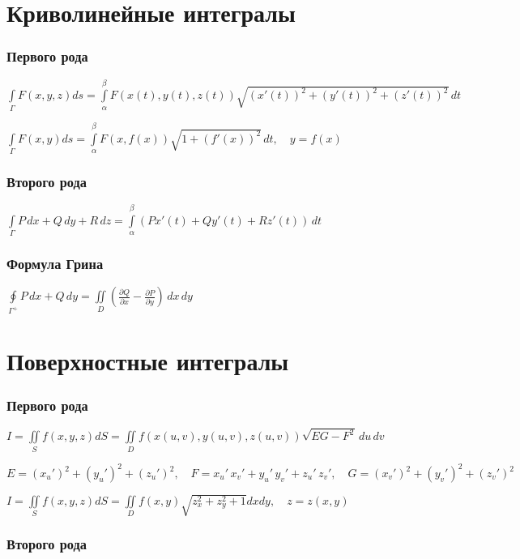 \section{Криволинейные интегралы}
\subsubsection{Первого рода}
$\int\limits_{\Gamma} F(x,y,z) ds = \int\limits_{\alpha}^{\beta} F(x(t),y(t),z(t))\sqrt{(x'(t))^2+(y'(t))^2+(z'(t))^2}\,dt$

$\int\limits_{\Gamma} F(x,y) ds = \int\limits_{\alpha}^{\beta} F(x,f(x))\sqrt{1+(f'(x))^2}\,dt, \quad y=f(x)$

\subsubsection{Второго рода}
$\int\limits_{\Gamma} P\,dx+Q\,dy+R\,dz=\int\limits_{\alpha}^{\beta} \left(P x'(t)+ Q y'(t)+ R z'(t)\right)\,dt$

\subsubsection{Формула Грина}
$\oint\limits_{\Gamma ^{+}} P \,dx + Q \,dy = \iint\limits_{D} \left( \frac{\partial Q}{\partial x} - \frac{\partial P}{\partial y} \right) \,dx\,dy$

\section{Поверхностные интегралы}
\subsubsection{Первого рода} 
${ I=\iint \limits _{S}{f\left(x, y, z\right)dS }=\iint \limits _{D}{f\left(x\left(u,v\right),y\left(u,v\right),z\left(u,v\right)\right){\sqrt {EG-F^{2}}}\,du\,dv}}$

${ E=\left(x_{u}'\right)^{2}+\left(y_{u}'\right)^{2}+\left(z_{u}'\right)^{2}}, \quad {F=x_{u}'\,x_{v}'+y_{u}'\,y_{v}'+z_{u}'\,z_{v}'}, \quad { G=\left(x_{v}'\right)^{2}+\left(y_{v}'\right)^{2}+\left(z_{v}'\right)^{2}}$

$ I=\iint \limits _{S}{f\left(x, y, z\right)dS } = \iint \limits _{D} f(x,y) \sqrt {z_x^2 + z_y^2 + 1}dxdy, \quad z=z(x, y) $

\subsubsection{Второго рода} 

